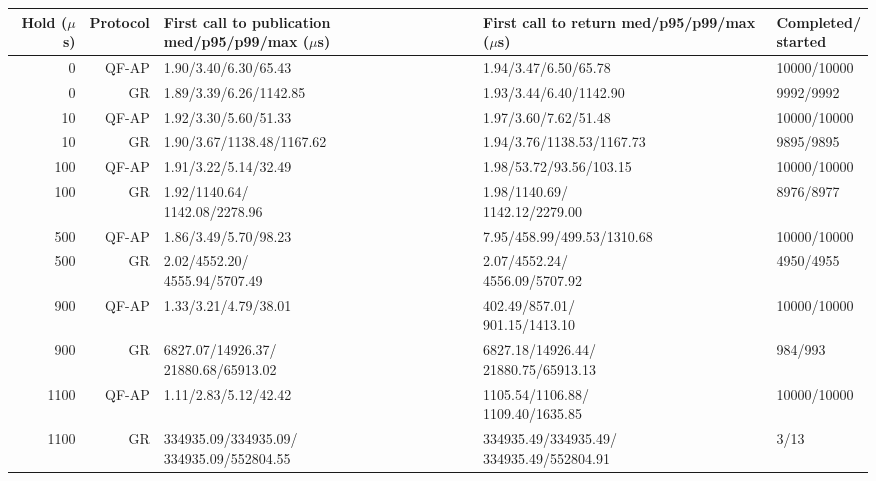 \begin{tabular}{@{}rrlll@{}}
\toprule
\shortstack{Hold\\($\mu$s)} & Protocol & \shortstack{First call to publication\\med/p95/p99/max ($\mu$s)} & \shortstack{First call to return\\med/p95/p99/max ($\mu$s)} & \shortstack{Completed/\\started} \\
\midrule
0 & QF-AP & 1.90/3.40/6.30/65.43 & 1.94/3.47/6.50/65.78 & 10000/10000 \\
0 & GR & 1.89/3.39/6.26/1142.85 & 1.93/3.44/6.40/1142.90 & 9992/9992 \\
10 & QF-AP & 1.92/3.30/5.60/51.33 & 1.97/3.60/7.62/51.48 & 10000/10000 \\
10 & GR & 1.90/3.67/1138.48/1167.62 & 1.94/3.76/1138.53/1167.73 & 9895/9895 \\
100 & QF-AP & 1.91/3.22/5.14/32.49 & 1.98/53.72/93.56/103.15 & 10000/10000 \\
100 & GR & \shortstack[r]{1.92/1140.64/\\1142.08/2278.96} & \shortstack[r]{1.98/1140.69/\\1142.12/2279.00} & 8976/8977 \\
500 & QF-AP & 1.86/3.49/5.70/98.23 & 7.95/458.99/499.53/1310.68 & 10000/10000 \\
500 & GR & \shortstack[r]{2.02/4552.20/\\4555.94/5707.49} & \shortstack[r]{2.07/4552.24/\\4556.09/5707.92} & 4950/4955 \\
900 & QF-AP & 1.33/3.21/4.79/38.01 & \shortstack[r]{402.49/857.01/\\901.15/1413.10} & 10000/10000 \\
900 & GR & \shortstack[r]{6827.07/14926.37/\\21880.68/65913.02} & \shortstack[r]{6827.18/14926.44/\\21880.75/65913.13} & 984/993 \\
1100 & QF-AP & 1.11/2.83/5.12/42.42 & \shortstack[r]{1105.54/1106.88/\\1109.40/1635.85} & 10000/10000 \\
1100 & GR & \shortstack[r]{334935.09/334935.09/\\334935.09/552804.55} & \shortstack[r]{334935.49/334935.49/\\334935.49/552804.91} & 3/13 \\
\bottomrule
\end{tabular}
